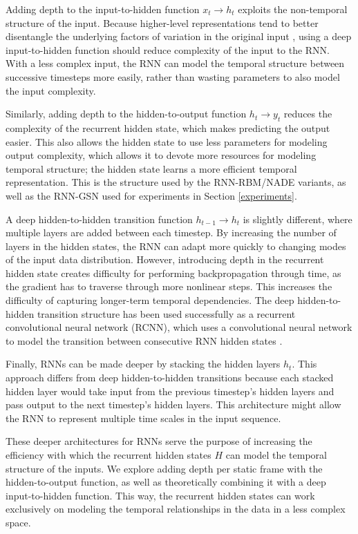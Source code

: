 Adding depth to the input-to-hidden function \(x_t \rightarrow h_t\) exploits the non-temporal structure of the input. Because higher-level representations tend to better disentangle the underlying factors of variation in the original input \cite{bengio13}, using a deep input-to-hidden function should reduce complexity of the input to the RNN. With a less complex input, the RNN can model the temporal structure between successive timesteps more easily, rather than wasting parameters to also model the input complexity.

Similarly, adding depth to the hidden-to-output function \(h_t \rightarrow y_t\) reduces the complexity of the recurrent hidden state, which makes predicting the output easier. This also allows the hidden state to use less parameters for modeling output complexity, which allows it to devote more resources for modeling temporal structure; the hidden state learns a more efficient temporal representation. This is the structure used by the RNN-RBM/NADE variants, as well as the RNN-GSN used for experiments in Section \ref{experiments}.

A deep hidden-to-hidden transition function \(h_{t-1} \rightarrow h_t\) is slightly different, where multiple layers are added between each timestep. By increasing the number of layers in the hidden states, the RNN can adapt more quickly to changing modes of the input data distribution. However, introducing depth in the recurrent hidden state creates difficulty for performing backpropagation through time, as the gradient has to traverse through more nonlinear steps. This increases the difficulty of capturing longer-term temporal dependencies. The deep hidden-to-hidden transition structure has been used successfully as a recurrent convolutional neural network (RCNN), which uses a convolutional neural network to model the transition between consecutive RNN hidden states \cite{rcnn}.

Finally, RNNs can be made deeper by stacking the hidden layers \(h_t\). This approach differs from deep hidden-to-hidden transitions because each stacked hidden layer would take input from the previous timestep's hidden layers and pass output to the next timestep's hidden layers. This architecture might allow the RNN to represent multiple time scales in the input sequence.

These deeper architectures for RNNs serve the purpose of increasing the efficiency with which the recurrent hidden states $H$ can model the temporal structure of the inputs. We explore adding depth per static frame with the hidden-to-output function, as well as theoretically combining it with a deep input-to-hidden function. This way, the recurrent hidden states can work exclusively on modeling the temporal relationships in the data in a less complex space.
